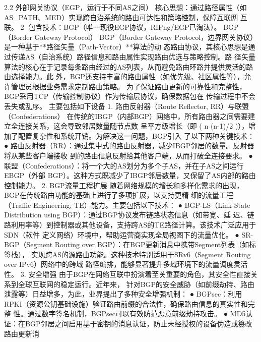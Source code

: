 2.2 外部网关协议（EGP，运行于不同AS之间）
核心思想：通过路径属性（如AS_PATH、MED）实现跨自治系统的路由可达性和策略控制，保障互联网
互联。
                                                                 2
包含技术：BGP（唯一现役EGP协议，RIPng/EGP已淘汰）。
BGP（Border Gateway Protocol）
BGP（Border Gateway Protocol，边界网关协议）是一种基于**路径矢量（Path-Vector）**算法的动
态路由协议，其核心思想是通过传递AS（自治系统）路径信息和路由属性实现路由优选与策略控制。路
径矢量算法的核心在于记录每条路由经过的AS列表，从而避免路由环路并提供灵活的路由选择能力。此
外，BGP还支持丰富的路由属性（如优先级、社区属性等），允许管理员根据业务需求定制路由策略。
为了保证路由更新的可靠性和完整性，BGP采用TCP（传输控制协议）作为传输层协议，确保数据包在
传输过程中不会丢失或乱序。
主要包括如下设备
1. 路由反射器（Route Reflector, RR）与联盟（Confederations）
在传统的IBGP（内部BGP）网络中，所有路由器之间需要建立全连接关系，这会导致邻居数量随节点数
呈平方级增长（即 ( n \times (n-1)/2 )），增加了配置复杂性和系统开销。为解决这一问题，BGP引入
了以下两种关键技术：
  ● 路由反射器（RR）：通过集中式的路由反射器，减少IBGP邻居的数量。反射器将从某些客户端接收
    到的路由信息反射给其他客户端，从而打破全连接要求。
  ● 联盟（Confederations）：将一个大的AS划分为多个子AS，并在子AS之间运行EBGP（外部
    BGP）。这种方式既减少了IBGP邻居数量，又保留了AS内部的路由控制能力。
2. BGP流量工程扩展
随着网络规模的增长和多样化需求的出现，BGP在传统路由功能的基础上进行了多项扩展，以支持更精
细的流量工程（Traffic Engineering, TE）能力。主要包括以下技术：
  ● BGP-LS（Link-State Distribution using BGP）：通过BGP协议发布链路状态信息（如带宽、延
    迟、链路利用率等）到控制器或其他设备，支持跨AS的TE路径计算。该技术广泛应用于SDN（软件
    定义网络）环境中，帮助运营商实现全局视图下的流量优化。
  ● SR-BGP（Segment Routing over BGP）：在BGP更新消息中携带Segment列表（如标签栈），
    实现跨AS的源路由功能。这种技术特别适用于SRv6（Segment Routing over IPv6）网络中的跨域
    路径编排，能够显著提升多域环境下的流量调度灵活性。
3. 安全增强
由于BGP在网络互联中扮演着至关重要的角色，其安全性直接关系到全球互联网的稳定运行。近年来，
针对BGP的安全威胁（如前缀劫持、路由泄露等）日益增多，为此，业界提出了多种安全增强机制：
  ● BGPsec：利用RPKI（资源公钥基础设施）验证路由前缀的合法性，确保路由信息的真实性和完整
    性。通过数字签名机制，BGPsec可以有效防范恶意前缀劫持攻击。
  ● MD5认证：在BGP邻居之间启用基于密钥的消息认证，防止未经授权的设备伪造或篡改路由更新消


